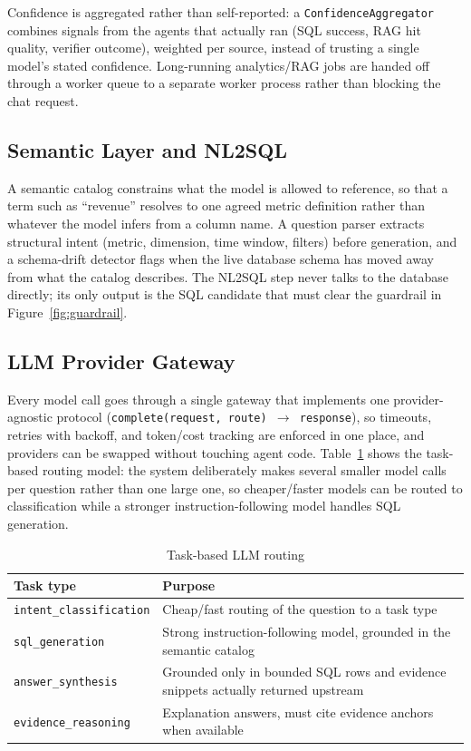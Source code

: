 \documentclass[conference]{IEEEtran}
\begin{document}
Confidence is aggregated rather than self-reported: a \texttt{ConfidenceAggregator}
combines signals from the agents that actually ran (SQL success, RAG hit
quality, verifier outcome), weighted per source, instead of trusting a
single model's stated confidence. Long-running analytics/RAG jobs are
handed off through a worker queue to a separate worker process rather than
blocking the chat request.

\subsection{Semantic Layer and NL2SQL}

A semantic catalog constrains what the model is allowed to reference, so
that a term such as ``revenue'' resolves to one agreed metric definition
rather than whatever the model infers from a column name. A question
parser extracts structural intent (metric, dimension, time window,
filters) before generation, and a schema-drift detector flags when the
live database schema has moved away from what the catalog describes. The
NL2SQL step never talks to the database directly; its only output is the
SQL candidate that must clear the guardrail in Figure~\ref{fig:guardrail}.

\subsection{LLM Provider Gateway}

Every model call goes through a single gateway that implements one
provider-agnostic protocol (\texttt{complete(request, route) $\rightarrow$
response}), so timeouts, retries with backoff, and token/cost tracking are
enforced in one place, and providers can be swapped without touching agent
code. Table~\ref{tab:routing} shows the task-based routing model: the
system deliberately makes several smaller model calls per question rather
than one large one, so cheaper/faster models can be routed to
classification while a stronger instruction-following model handles SQL
generation.

\begin{table}[t]
\centering
\caption{Task-based LLM routing}
\label{tab:routing}
\footnotesize
\begin{tabular}{@{}p{2.6cm}p{5cm}@{}}
\toprule
\textbf{Task type} & \textbf{Purpose} \\
\midrule
\texttt{intent\_classification} & Cheap/fast routing of the question to a task type \\
\texttt{sql\_generation} & Strong instruction-following model, grounded in the semantic catalog \\
\texttt{answer\_synthesis} & Grounded only in bounded SQL rows and evidence snippets actually returned upstream \\
\texttt{evidence\_reasoning} & Explanation answers, must cite evidence anchors when available \\
\bottomrule
\end{tabular}
\end{table}
\end{document}
